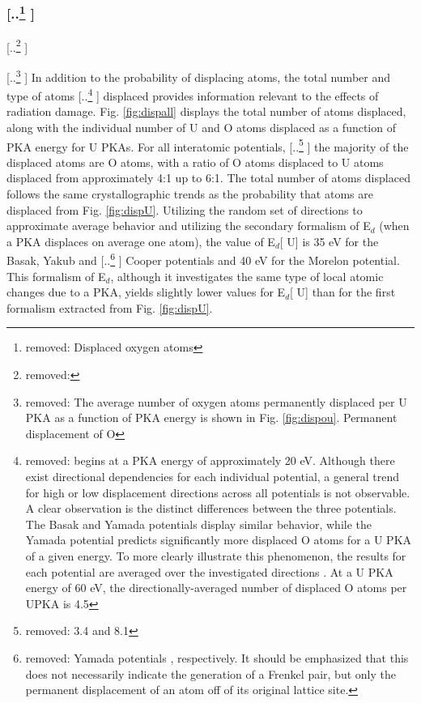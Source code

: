 \documentclass[review]{elsarticle} %
\providecommand{\DIFaddtex}[1]{{\protect\color{blue} \sf #1}} %
\providecommand{\DIFdeltex}[1]{{\protect\color{red} [..\footnote{removed: #1} ]}} %
\providecommand{\DIFaddbegin}{} %
\providecommand{\DIFaddend}{} %
\providecommand{\DIFdelbegin}{} %
\providecommand{\DIFdelend}{} %
\providecommand{\DIFadd}[1]{\texorpdfstring{\DIFaddtex{#1}}{#1}} %
\providecommand{\DIFdel}[1]{\texorpdfstring{\DIFdeltex{#1}}{}} %
\newcommand{\DIFscaledelfig}{0.5}
\newlength{\DIFdelgraphicswidth} %
\newlength{\DIFdelgraphicsheight} %
\newcommand{\DIFaddincludegraphics}[2][]{{\color{blue}\fbox{\DIFOincludegraphics[#1]{#2}}}} %
\newcommand{\DIFdelincludegraphics}[2][]{%
\sbox{\DIFdelgraphicsbox}{\DIFOincludegraphics[#1]{#2}}%
\settoboxwidth{\DIFdelgraphicswidth}{\DIFdelgraphicsbox} %
\settoboxtotalheight{\DIFdelgraphicsheight}{\DIFdelgraphicsbox} %
\scalebox{\DIFscaledelfig}{%
\parbox[b]{\DIFdelgraphicswidth}{\usebox{\DIFdelgraphicsbox}\\[-\baselineskip] \rule{\DIFdelgraphicswidth}{0em}}\llap{\resizebox{\DIFdelgraphicswidth}{\DIFdelgraphicsheight}{%
\setlength{\unitlength}{\DIFdelgraphicswidth}%
\begin{picture}(1,1)%
\thicklines\linethickness{2pt} %
{\color[rgb]{1,0,0}\put(0,0){\framebox(1,1){}}}%
{\color[rgb]{1,0,0}\put(0,0){\line( 1,1){1}}}%
{\color[rgb]{1,0,0}\put(0,1){\line(1,-1){1}}}%
\end{picture}%
}\hspace*{3pt}}} %
} %
\DeclareRobustCommand{\DIFaddbegin}{\DIFOaddbegin \let\includegraphics\DIFaddincludegraphics} %
\DeclareRobustCommand{\DIFaddend}{\DIFOaddend \let\includegraphics\DIFOincludegraphics} %
\DeclareRobustCommand{\DIFdelbegin}{\DIFOdelbegin \let\includegraphics\DIFdelincludegraphics} %
\DeclareRobustCommand{\DIFdelend}{\DIFOaddend \let\includegraphics\DIFOincludegraphics} %
\begin{document}
\subsubsection{\DIFdel{Displaced oxygen atoms}}
\addtocounter{subsubsection}{-1}%
\DIFdel{\hspace{5mm}
}%

\DIFdel{The average number of oxygen atoms permanently displaced per U PKA as a function of PKA energy is shown in Fig. \ref{fig:dispou}. Permanent displacement of O }\DIFdelend \DIFaddbegin \DIFadd{In addition to the probability of displacing atoms, the total number and type of }\DIFaddend atoms \DIFdelbegin \DIFdel{begins at a PKA energy of approximately 20 eV. Although there exist directional dependencies for each individual potential, a general trend for high or low displacement directions across all potentials is not observable. A clear observation is the distinct differences between the three potentials. The Basak and Yamada potentials display similar behavior, while the Yamada potential predicts significantly more displaced O atoms for a U PKA of a given energy. To more clearly illustrate this phenomenon, the results for each potential are averaged over the investigated directions . At a U PKA energy of 60 eV, the directionally-averaged number of displaced O atoms per UPKA is 4.5}\DIFdelend \DIFaddbegin \DIFadd{displaced provides information relevant to the effects of radiation damage. Fig. \ref{fig:dispall} displays the total number of atoms displaced, along with the individual number of U and O atoms displaced as a function of PKA energy for U PKAs. For all interatomic potentials}\DIFaddend , \DIFdelbegin \DIFdel{3.4 and 8.1 }\DIFdelend \DIFaddbegin \DIFadd{the majority of the displaced atoms are O atoms, with a ratio of O atoms displaced to U atoms displaced from approximately 4:1 up to 6:1. The total number of atoms displaced follows the same crystallographic trends as the probability that atoms are displaced from Fig. \ref{fig:dispU}. Utilizing the random set of directions to approximate average behavior and utilizing the secondary formalism of E$_d$ (when a PKA displaces on average one atom), the value of E$_d$}[\DIFadd{U}] \DIFadd{is 35 eV }\DIFaddend for the Basak, Yakub and \DIFdelbegin \DIFdel{Yamada potentials , respectively. It should be emphasized that this does not necessarily indicate the generation of a Frenkel pair, but only the permanent displacement of an atom off of its original lattice site. }\DIFdelend \DIFaddbegin \DIFadd{Cooper potentials and 40 eV for the Morelon potential. This formalism of E$_d$, although it investigates the same type of local atomic changes due to a PKA, yields slightly lower values for E$_d$}[\DIFadd{U}] \DIFadd{than for the first formalism extracted from Fig. \ref{fig:dispU}.
}\DIFaddend 
\end{document}
